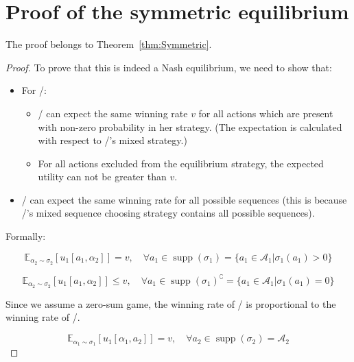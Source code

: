 \documentclass{article}
\theoremstyle{definition}
\newcommand{\E}{\mathbb{E}}
\DeclareMathOperator\supp{supp}
\begin{document}
\newpage

\appendix

\section{Proof of the symmetric equilibrium}

\label{Appendix:FisherGameEquilibrium}

The proof belongs to Theorem~\ref{thm:Symmetric}.

\begin{proof}
\label{proof:Symmetric}
To prove that this is indeed a Nash equilibrium, we need to show that:

\begin{itemize}
    \item For \PI/:
    \begin{itemize}
        \item \PI/ can expect the same winning rate $v$ for all actions which are present with non-zero probability in her strategy. (The expectation is calculated with respect to \PII/'s mixed strategy.)
        \item For all actions excluded from the equilibrium strategy, the expected utility can not be greater than $v$.
    \end{itemize}
    \item \PII/ can expect the same winning rate for all possible sequences (this is because \PI/'s mixed sequence choosing strategy contains all possible sequences).
\end{itemize}

Formally:

\begin{equation}
    \label{eq:1equal}
    \E_{\alpha_2 \sim \sigma_2} \left [ u_1[a_1,\alpha_2] \right ] = v, \quad 
    \forall a_1 \in \supp(\sigma_1) = \{ a_1 \in \mathcal{A}_1 | \sigma_1(a_1) > 0 \}
\end{equation}

\begin{equation}
    \label{eq:dominated}
    \E_{\alpha_2 \sim \sigma_2} \left [ u_1[a_1,\alpha_2] \right ] \le v, \quad 
    \forall a_1 \in \supp(\sigma_1)^{\complement} = \{ a_1 \in \mathcal{A}_1 | \sigma_1(a_1) = 0 \}
\end{equation}

Since we assume a zero-sum game, the winning rate of \PII/ is proportional to the winning rate of \PI/.

\begin{equation}
    \label{eq:2equal}
    \E_{\alpha_1 \sim \sigma_1} \left [ u_1[\alpha_1,a_2] \right ] = v, \quad 
    \forall a_2 \in \supp (\sigma_2) = \mathcal{A}_2
\end{equation}


\end{proof}
\end{document}
